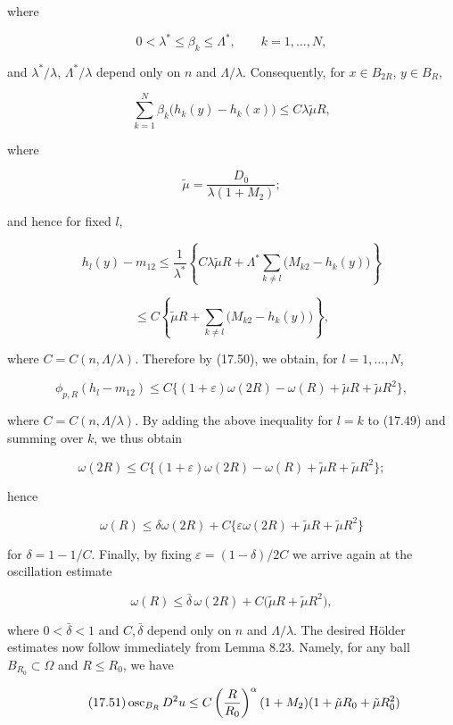 
where

\[
0 < \lambda^* \le \beta_k \le \Lambda^*, \qquad k = 1,\dotsc,N,
\]

and $\lambda^*/\lambda$, $\Lambda^*/\lambda$ depend only on $n$ and $\Lambda/\lambda$. Consequently, for $x \in B_{2R}$, $y \in B_R$,

\[
\sum_{k=1}^N \beta_k\bigl(h_k(y) - h_k(x)\bigr) \le C \lambda \tilde{\mu} R,
\]

where

\[
\tilde{\mu} = \frac{D_0}{\lambda(1+M_2)};
\]

and hence for fixed $l$,

\[
h_l(y) - m_{12} \le \frac{1}{\lambda^*}\left\{C\lambda \tilde{\mu} R + \Lambda^*\sum_{k \ne l}\bigl(M_{k2} - h_k(y)\bigr)\right\}
\]

\[
\le C\left\{\tilde{\mu}R + \sum_{k \ne l}\bigl(M_{k2} - h_k(y)\bigr)\right\},
\]

where $C = C(n,\Lambda/\lambda)$. Therefore by (17.50), we obtain, for $l = 1,\dotsc,N$,

\[
\phi_{p,R}(h_l - m_{12}) \le C\bigl\{(1+\varepsilon)\omega(2R) - \omega(R) + \tilde{\mu}R + \tilde{\mu}R^2\bigr\},
\]

where $C = C(n,\Lambda/\lambda)$. By adding the above inequality for $l = k$ to (17.49) and summing over $k$, we thus obtain

\[
\omega(2R) \le C\bigl\{(1+\varepsilon)\omega(2R) - \omega(R) + \tilde{\mu}R + \tilde{\mu}R^2\bigr\};
\]

hence

\[
\omega(R) \le \delta\omega(2R) + C\bigl\{\varepsilon\omega(2R) + \tilde{\mu}R + \tilde{\mu}R^2\bigr\}
\]

for $\delta = 1 - 1/C$. Finally, by fixing $\varepsilon = (1-\delta)/2C$ we arrive again at the oscillation estimate

\[
\omega(R) \le \bar{\delta}\,\omega(2R) + C\bigl(\tilde{\mu}R + \tilde{\mu}R^2\bigr),
\]

where $0 < \bar{\delta} < 1$ and $C,\bar{\delta}$ depend only on $n$ and $\Lambda/\lambda$. The desired Hölder estimates now follow immediately from Lemma 8.23. Namely, for any ball $B_{R_0} \subset \Omega$ and $R \le R_0$, we have

\[
\tag{17.51}
\operatorname{osc}_{B_R} D^2u \le C\left(\frac{R}{R_0}\right)^\alpha (1+M_2)(1+\tilde{\mu}R_0+\tilde{\mu}R_0^2)
\]


